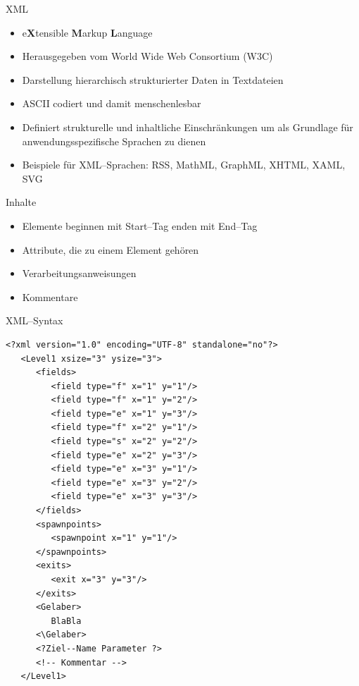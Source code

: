\documentclass{beamer}
\begin{document}
\begin{frame}{XML}
  \begin{itemize}
    \item  e\textbf{X}tensible \textbf{M}arkup \textbf{L}anguage
    \item  Herausgegeben vom World Wide Web Consortium (W3C)
    \item  Darstellung hierarchisch strukturierter Daten in Textdateien
    \item  ASCII codiert und damit menschenlesbar
    \item  Definiert strukturelle und inhaltliche Einschränkungen um als Grundlage für 	anwendungsspezifische Sprachen zu dienen
    \item  Beispiele für XML--Sprachen: RSS, MathML, GraphML, XHTML, XAML, SVG
  \end{itemize}
\end{frame}

\begin{frame}{Inhalte}
  \begin{itemize}
    \item  Elemente beginnen mit Start--Tag enden mit End--Tag
    \item  Attribute, die zu einem Element gehören
    \item  Verarbeitungsanweisungen
    \item  Kommentare
  \end{itemize}
\end{frame}


\begin{frame}[fragile]{XML--Syntax}
\begin{lstlisting}
<?xml version="1.0" encoding="UTF-8" standalone="no"?>
   <Level1 xsize="3" ysize="3">
      <fields>
         <field type="f" x="1" y="1"/>
         <field type="f" x="1" y="2"/>
         <field type="e" x="1" y="3"/>
         <field type="f" x="2" y="1"/>
         <field type="s" x="2" y="2"/>
         <field type="e" x="2" y="3"/>
         <field type="e" x="3" y="1"/>
         <field type="e" x="3" y="2"/>
         <field type="e" x="3" y="3"/>
      </fields>
      <spawnpoints>
         <spawnpoint x="1" y="1"/>
      </spawnpoints>
      <exits>
         <exit x="3" y="3"/>
      </exits>
      <Gelaber>
         BlaBla
      <\Gelaber>
      <?Ziel--Name Parameter ?>
      <!-- Kommentar -->
   </Level1>
\end{lstlisting}
\end{frame}
\end{document}
